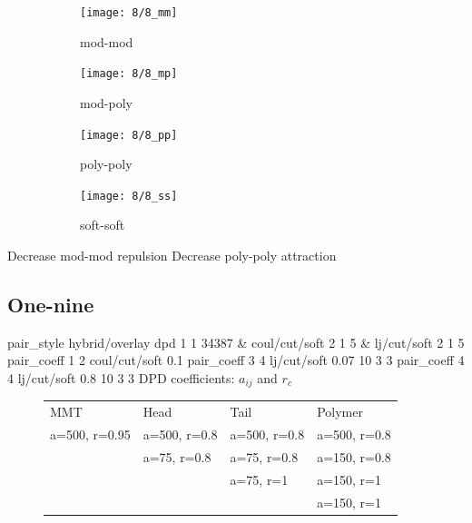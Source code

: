 \documentclass[a4paper]{article}
\begin{document}
\begin{figure}[H]
\begin{subfigure}{0.24\textwidth}
  \centering
  \texttt{[image: 8/8\_mm]}
  \caption{mod-mod}
\end{subfigure}
\begin{subfigure}{0.24\textwidth}
  \centering
  \texttt{[image: 8/8\_mp]}
  \caption{mod-poly}
\end{subfigure}
\begin{subfigure}{0.24\textwidth}
  \centering
  \texttt{[image: 8/8\_pp]}
  \caption{poly-poly}
\end{subfigure}
\begin{subfigure}{0.24\textwidth}
  \centering
  \texttt{[image: 8/8\_ss]}
  \caption{soft-soft}
\end{subfigure}
\caption{}
\label{fig_1}
\end{figure}
Decrease mod-mod repulsion\newline
Decrease poly-poly attraction


\subsection*{One-nine}
pair\_style hybrid/overlay dpd 1 1 34387 \& coul/cut/soft 2 1 5 \& 
lj/cut/soft 2 1 5\newline
pair\_coeff 1 2 coul/cut/soft 0.1\newline
pair\_coeff 3 4 lj/cut/soft 0.07    10 3 3\newline
pair\_coeff 4 4 lj/cut/soft 0.8     10 3 3\newline
DPD coefficients: $a_{ij}$ and $r_c$
\begin{figure}[H]\begin{tabular}{llll}
MMT           & Head         & Tail         & Polymer      \\
a=500, r=0.95 & a=500, r=0.8 & a=500, r=0.8 & a=500, r=0.8 \\
              & a=75,  r=0.8 & a=75,  r=0.8 & a=150, r=0.8 \\
              &              & a=75,  r=1   & a=150, r=1   \\
              &              &              & a=150, r=1   \\
\end{tabular}\end{figure}
\end{document}
